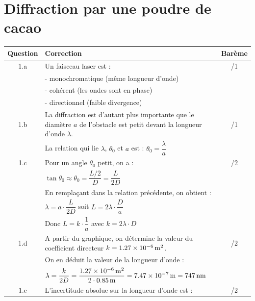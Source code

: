 \documentclass[a4paper,14pt,fleqn]{article}%
\begin{document}
\section{Diffraction par une poudre de cacao}
\begin{table}[h!]
    \begin{center}
        \begin{tabular}{|c|m{15cm}|c|}
            \hline
            Question & Correction & Barème \\
            \hline
            1.a & Un faisceau laser est : & /1\\
             & - monochromatique (même longueur d'onde) & \\
             & - cohérent (les ondes sont en phase) & \\
             & - directionnel (faible divergence) & \\
             \hline
            1.b & La diffraction est d'autant plus importante que le diamètre $a$ de l'obstacle est petit devant la longueur d'onde $\lambda$. & /1\\
             & La relation qui lie $\lambda$, $\theta_0$ et $a$ est : $\theta_0 = \dfrac{\lambda}{a} $ & \\
             \hline
            1.c & Pour un angle $\theta_0$ petit, on a : & /2\\
             & $\tan \theta_0 \approx \theta_0 = \dfrac{L/2}{D} = \dfrac{L}{2D}$ & \\
             & En remplaçant dans la relation précédente, on obtient : & \\
             & $\lambda = a \cdot \dfrac{L}{2D}$ soit $L = 2 \lambda \cdot \dfrac{D}{a}$ & \\
             & Donc $L = k \cdot \dfrac{1}{a}$ avec $k = 2 \lambda \cdot D$ & \\
             \hline
            1.d & A partir du graphique, on détermine la valeur du coefficient directeur $k = \SI{1,27E-6}{\meter\squared}$. & /2\\
             & On en déduit la valeur de la longueur d'onde : & \\
             & $\lambda = \dfrac{k}{2D} = \dfrac{\SI{1,27E-6}{\meter\squared}}{2 \cdot \SI{0,85}{\meter}} = \SI{7,47E-7}{\meter} = \SI{747}{nm}$ & \\
             \hline
            1.e & L'incertitude absolue sur la longueur d'onde est : & /2\\

\end{tabular}
\end{center}
\end{table}
\end{document}
